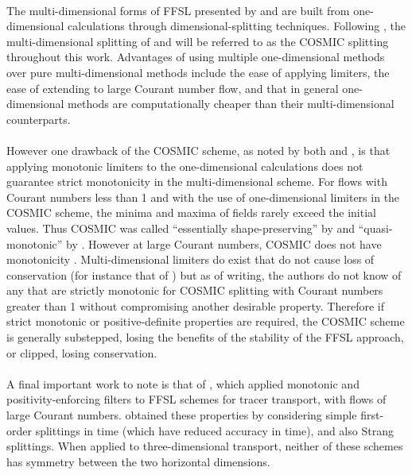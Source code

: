 \documentclass{ametsocV6.1}
\begin{document}
\\
The multi-dimensional forms of FFSL presented by \citet{leonard1996cosmic} and \citet{lin1996ffsl} are built from one-dimensional calculations through dimensional-splitting techniques.
Following \citet{leonard1996cosmic}, the multi-dimensional splitting of \citet{leonard1996cosmic} and \citet{lin1996ffsl} will be referred to as the COSMIC splitting throughout this work.
Advantages of using multiple one-dimensional methods over pure multi-dimensional methods include the ease of applying limiters, the ease of extending to large Courant number flow, and that in general one-dimensional methods are computationally cheaper than their multi-dimensional counterparts. \\
\\
However one drawback of the COSMIC scheme, as noted by both \citet{leonard1996cosmic} and \citet{lin1996ffsl},  is that applying monotonic limiters to the one-dimensional calculations does not guarantee strict monotonicity in the multi-dimensional scheme.
For flows with Courant numbers less than 1 and with the use of one-dimensional limiters in the COSMIC scheme, the minima and maxima of fields rarely exceed the initial values.
Thus COSMIC was called ``essentially shape-preserving'' by \citet{leonard1996cosmic} and ``quasi-monotonic'' by \citet{putman2007fvtransport}.
However at large Courant numbers, COSMIC does not have monotonicity \citep{leonard1996cosmic,bott2010improving}.
Multi-dimensional limiters do exist that do not cause loss of conservation (for instance that of \citet{thuburn1996multidimensional}) but as of writing, the authors do not know of any that are strictly monotonic for COSMIC splitting with Courant numbers greater than 1 without compromising another desirable property.
Therefore if strict monotonic or positive-definite properties are required, the COSMIC scheme is generally substepped, losing the benefits of the stability of the FFSL approach, or clipped, losing conservation. \\
\\
A final important work to note is that of \citet{skamarock2006limiters}, which applied monotonic and positivity-enforcing filters to FFSL schemes for tracer transport, with flows of large Courant numbers.
\citet{skamarock2006limiters} obtained these properties by considering simple first-order splittings in time (which have reduced accuracy in time), and also Strang splittings.
When applied to three-dimensional transport, neither of these schemes has symmetry between the two horizontal dimensions.
 
\end{document}
